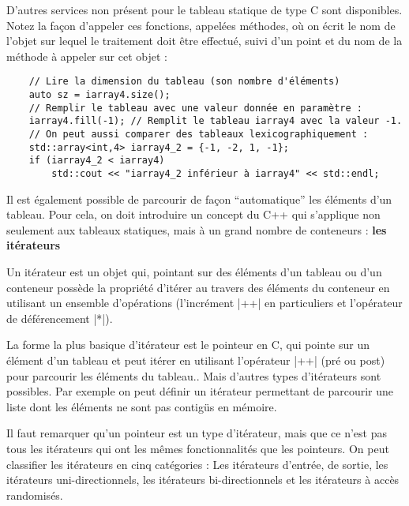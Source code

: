 D'autres services non présent pour le tableau statique de type C sont disponibles. Notez la façon d'appeler ces fonctions, appelées méthodes, où on écrit le nom de l'objet sur lequel le traitement doit être effectué, suivi d'un point et du nom de la méthode à appeler sur cet objet :

\begin{lstlisting}
    // Lire la dimension du tableau (son nombre d'éléments)
    auto sz = iarray4.size();
    // Remplir le tableau avec une valeur donnée en paramètre :
    iarray4.fill(-1); // Remplit le tableau iarray4 avec la valeur -1.
    // On peut aussi comparer des tableaux lexicographiquement :
    std::array<int,4> iarray4_2 = {-1, -2, 1, -1};
    if (iarray4_2 < iarray4) 
        std::cout << "iarray4_2 inférieur à iarray4" << std::endl;
\end{lstlisting}

Il est également possible de parcourir de façon ``automatique'' les éléments d'un tableau. Pour cela, on doit introduire un concept du C++ qui s'applique non seulement aux tableaux statiques, mais à un grand nombre de conteneurs : \textbf{les itérateurs}

Un itérateur est un objet qui, pointant sur des éléments d'un tableau ou d'un conteneur possède la propriété d'itérer au travers des éléments du conteneur en utilisant un ensemble d'opérations (l'incrément |++| en particuliers et l'opérateur de déférencement |*|). 

La forme la plus basique d'itérateur est le pointeur en C, qui pointe sur un élément d'un tableau et peut itérer en utilisant l'opérateur |++| (pré ou post) pour parcourir les éléments du tableau.. Mais d'autres types d'itérateurs sont possibles. Par exemple on peut définir un itérateur permettant de parcourir une liste dont les éléments ne sont pas contigüs en mémoire. 

Il faut remarquer qu'un pointeur est un type d'itérateur, mais que ce n'est pas tous les itérateurs qui ont les mêmes fonctionnalités que les pointeurs. On peut classifier les itérateurs en cinq catégories : Les itérateurs d'entrée, de sortie, les itérateurs uni-directionnels, les itérateurs bi-directionnels et les itérateurs à accès randomisés.

